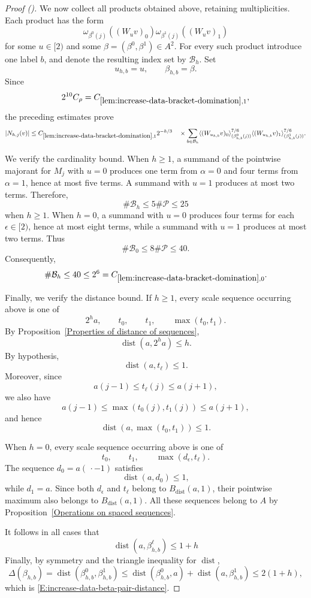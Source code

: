 \documentclass[12pt,reqno]{amsart}
\newcommand{\auto}{{({\tiny\faCar})}}
\theoremstyle{plain}
\numberwithin{equation}{section}
\theoremstyle{remark}
\DeclareMathOperator{\dist}{dist}
\begin{document}
\begin{proof}[Proof \auto]
We now collect all products obtained above, retaining
multiplicities. Each product has the form
\[
\omega_{\beta^0(j)}((W_uv)_0)
\omega_{\beta^1(j)}((W_uv)_1)
\]
for some \(u\in[2)\) and some
\(\beta=(\beta^0,\beta^1)\in A^2\).
For every such product introduce one label \(b\), and denote the
resulting index set by \(\mathcal B_h\). Set
\[
u_{h,b}=u,
\qquad
\beta_{h,b}=\beta.
\]
Since
\[
2^{10}C_\rho
=
C_{\ref{lem:increase-data-bracket-domination},1},
\]
the preceding estimates prove
\[
|N_{h,j}(v)| \leq C_{\ref{lem:increase-data-bracket-domination},1} 2^{-h/3} \quad\times \sum_{b\in\mathcal B_h} \langle(W_{u_{h,b}}v)_0 \rangle_{(\beta_{h,b}^0(j))}^{7/6} \langle(W_{u_{h,b}}v)_1 \rangle_{(\beta_{h,b}^1(j))}^{7/6}.
\]

We verify the cardinality bound. When \(h\geq1\), a summand of the
pointwise majorant for \(M_j\) with \(u=0\) produces one term from
\(\alpha=0\) and four terms from \(\alpha=1\), hence at most five
terms. A summand with \(u=1\) produces at most two terms. Therefore,
\[
\#\mathcal B_h
\leq
5\#\mathcal P
\leq
25
\]
when \(h\geq1\). When \(h=0\), a summand with \(u=0\) produces four
terms for each \(\epsilon\in[2)\), hence at most eight terms, while
a summand with \(u=1\) produces at most two terms. Thus
\[
\#\mathcal B_0
\leq
8\#\mathcal P
\leq
40.
\]
Consequently,
\[
\#\mathcal B_h
\leq
40
\leq
2^6
=
C_{\ref{lem:increase-data-bracket-domination},0}.
\]

Finally, we verify the distance bound. If \(h\geq1\), every scale
sequence occurring above is one of
\[
2^ha,\qquad
t_0,\qquad
t_1,\qquad
\max(t_0,t_1).
\]
By Proposition~\ref{Properties of distance of sequences},
\[
\dist(a,2^ha)\leq h.
\]
By hypothesis,
\[
\dist(a,t_\ell)\leq1.
\]
Moreover, since
\[
a(j-1)\leq t_\ell(j)\leq a(j+1),
\]
we also have
\[
a(j-1)
\leq
\max(t_0(j),t_1(j))
\leq
a(j+1),
\]
and hence
\[
\dist(a,\max(t_0,t_1))\leq1.
\]

When \(h=0\), every scale sequence occurring above is one of
\[
t_0,\qquad
t_1,\qquad
\max(d_\epsilon,t_\ell).
\]
The sequence \(d_0=a(\,\cdot-1)\) satisfies
\[
\dist(a,d_0)\leq1,
\]
while \(d_1=a\). Since both \(d_\epsilon\) and \(t_\ell\) belong to
\(B_{\dist}(a,1)\), their pointwise maximum also belongs to
\(B_{\dist}(a,1)\). All these sequences belong to \(A\) by
Proposition~\ref{Operations on spaced sequences}.

It follows in all cases that
\[
\dist(a,\beta_{h,b}^\ell)
\leq
1+h
\]
Finally, by symmetry and the triangle inequality for \(\dist\),
\[
\Delta(\beta_{h,b}) = \dist(\beta_{h,b}^0,\beta_{h,b}^1) \leq \dist(\beta_{h,b}^0,a) + \dist(a,\beta_{h,b}^1) \leq 2(1+h),
\]
which is
\eqref{E:increase-data-beta-pair-distance}.
\end{proof}
\end{document}
